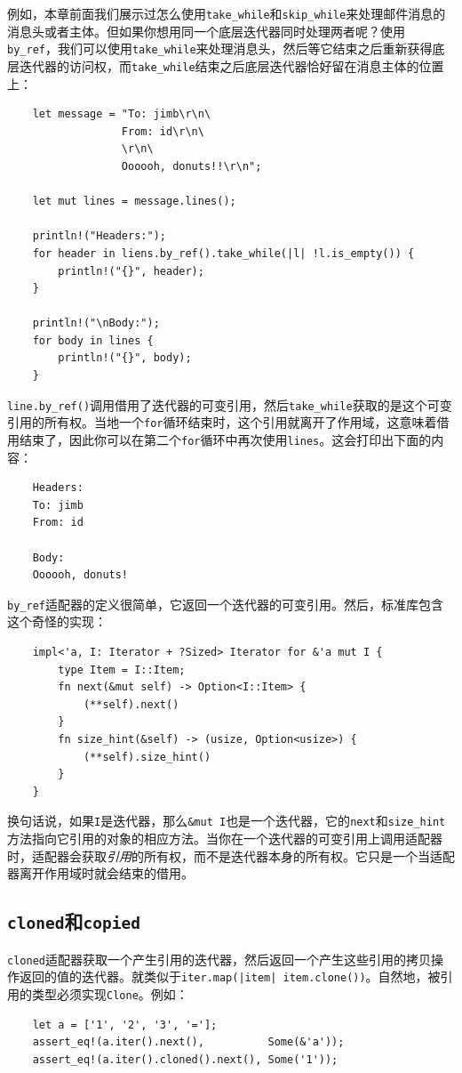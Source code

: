 例如，本章前面我们展示过怎么使用\texttt{take\_while}和\texttt{skip\_while}来处理邮件消息的消息头或者主体。但如果你想用同一个底层迭代器同时处理两者呢？使用\texttt{by\_ref}，我们可以使用\texttt{take\_while}来处理消息头，然后等它结束之后重新获得底层迭代器的访问权，而\texttt{take\_while}结束之后底层迭代器恰好留在消息主体的位置上：
\begin{verbatim}
    let message = "To: jimb\r\n\
                  From: id\r\n\
                  \r\n\
                  Oooooh, donuts!!\r\n";

    let mut lines = message.lines();

    println!("Headers:");
    for header in liens.by_ref().take_while(|l| !l.is_empty()) {
        println!("{}", header);
    }

    println!("\nBody:");
    for body in lines {
        println!("{}", body);
    }
\end{verbatim}
\texttt{line.by\_ref()}调用借用了迭代器的可变引用，然后\texttt{take\_while}获取的是这个可变引用的所有权。当地一个\texttt{for}循环结束时，这个引用就离开了作用域，这意味着借用结束了，因此你可以在第二个\texttt{for}循环中再次使用\texttt{lines}。这会打印出下面的内容：
\begin{verbatim}
    Headers:
    To: jimb
    From: id

    Body:
    Oooooh, donuts!
\end{verbatim}

\texttt{by\_ref}适配器的定义很简单，它返回一个迭代器的可变引用。然后，标准库包含这个奇怪的实现：
\begin{verbatim}
    impl<'a, I: Iterator + ?Sized> Iterator for &'a mut I {
        type Item = I::Item;
        fn next(&mut self) -> Option<I::Item> {
            (**self).next()
        }
        fn size_hint(&self) -> (usize, Option<usize>) {
            (**self).size_hint()
        }
    }
\end{verbatim}

换句话说，如果\texttt{I}是迭代器，那么\texttt{\&mut I}也是一个迭代器，它的\texttt{next}和\texttt{size\_hint}方法指向它引用的对象的相应方法。当你在一个迭代器的可变引用上调用适配器时，适配器会获取\emph{引用}的所有权，而不是迭代器本身的所有权。它只是一个当适配器离开作用域时就会结束的借用。

\subsection{\texttt{cloned}和\texttt{copied}}
\texttt{cloned}适配器获取一个产生引用的迭代器，然后返回一个产生这些引用的拷贝操作返回的值的迭代器。就类似于\texttt{iter.map(|item| item.clone())}。自然地，被引用的类型必须实现\texttt{Clone}。例如：
\begin{verbatim}
    let a = ['1', '2', '3', '='];
    assert_eq!(a.iter().next(),          Some(&'a'));
    assert_eq!(a.iter().cloned().next(), Some('1'));
\end{verbatim}

